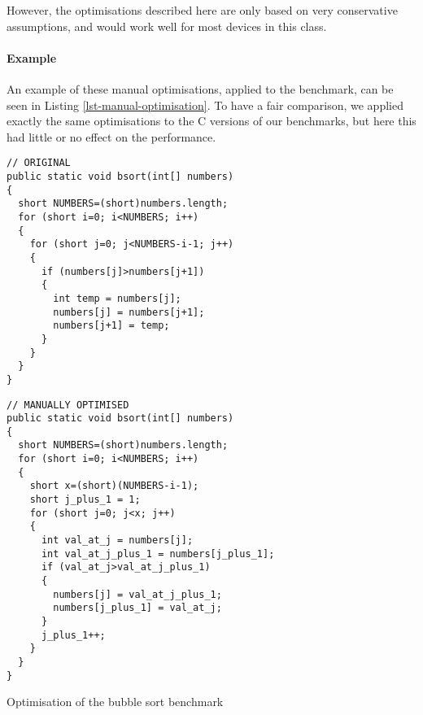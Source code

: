 However, the optimisations described here are only based on very conservative assumptions, and would work well for most devices in this class.

\paragraph{Example} An example of these manual optimisations, applied to the  benchmark, can be seen in Listing \ref{lst-manual-optimisation}. To have a fair comparison, we applied exactly the same optimisations to the C versions of our benchmarks, but here this had little or no effect on the performance.

\begin{listing}
\centering

\begin{minipage}[t]{0.47\textwidth}
\centering
  \begin{verbatim}
// ORIGINAL
public static void bsort(int[] numbers)
{
  short NUMBERS=(short)numbers.length;
  for (short i=0; i<NUMBERS; i++)
  {
    for (short j=0; j<NUMBERS-i-1; j++)
    {
      if (numbers[j]>numbers[j+1])
      {
        int temp = numbers[j];
        numbers[j] = numbers[j+1];
        numbers[j+1] = temp;
      }
    }
  }
}
\end{verbatim}
\end{minipage}
\hfill
\begin{minipage}[t]{0.52\textwidth}
\centering
\begin{verbatim}
// MANUALLY OPTIMISED
public static void bsort(int[] numbers)
{
  short NUMBERS=(short)numbers.length;
  for (short i=0; i<NUMBERS; i++)
  {
    short x=(short)(NUMBERS-i-1);
    short j_plus_1 = 1;
    for (short j=0; j<x; j++)
    {
      int val_at_j = numbers[j];
      int val_at_j_plus_1 = numbers[j_plus_1];
      if (val_at_j>val_at_j_plus_1)
      {
        numbers[j] = val_at_j_plus_1;
        numbers[j_plus_1] = val_at_j;
      }
      j_plus_1++;
    }
  }
}
\end{verbatim}
\end{minipage}
\caption{Optimisation of the bubble sort benchmark}
\label{lst-manual-optimisation}
\end{listing}


